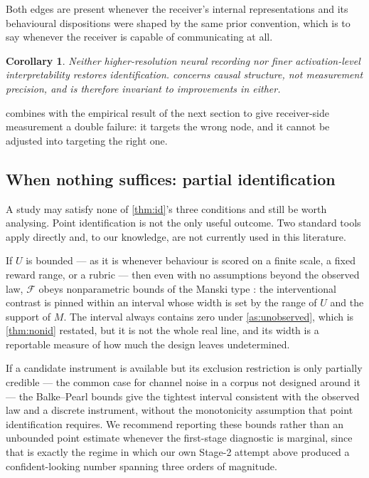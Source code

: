 \documentclass[11pt,a4paper]{article}
\theoremstyle{plain}
\newtheorem{corollary}[corollary]{Corollary}
\theoremstyle{definition}
\theoremstyle{remark}
\newcommand{\Fc}{\mathcal{F}}
\begin{document}
Both edges are present whenever the receiver's internal representations and its behavioural
dispositions were shaped by the same prior convention, which is to say whenever the receiver is
capable of communicating at all.

\begin{corollary}\label{cor:resolution}
Neither higher-resolution neural recording nor finer activation-level interpretability restores
identification.  concerns causal structure, not measurement precision, and
is therefore invariant to improvements in either.
\end{corollary}

 combines with the empirical result of the next section to give
receiver-side measurement a double failure: it targets the wrong node, and it cannot be adjusted
into targeting the right one.

\subsection{When nothing suffices: partial identification}\label{sec:bounds}

A study may satisfy none of \cref{thm:id}'s three conditions and still be worth analysing. Point
identification is not the only useful outcome. Two standard tools apply directly and, to our
knowledge, are not currently used in this literature.

If $U$ is bounded --- as it is whenever behaviour is scored on a finite scale, a fixed reward
range, or a rubric --- then even with no assumptions beyond the observed law, $\Fc$ obeys
nonparametric bounds of the Manski type \citep{manski1990nonparametric}: the interventional
contrast is pinned within an interval whose width is set by the range of $U$ and the support of
$M$. The interval always contains zero under \cref{as:unobserved}, which is \cref{thm:nonid}
restated, but it is not the whole real line, and its width is a reportable measure of how much
the design leaves undetermined.

If a candidate instrument is available but its exclusion restriction is only partially credible
--- the common case for channel noise in a corpus not designed around it --- the Balke--Pearl
bounds \citep{balke1997bounds} give the tightest interval consistent with the observed law and a
discrete instrument, without the monotonicity assumption that point identification requires. We
recommend reporting these bounds rather than an unbounded point estimate whenever the first-stage
diagnostic is marginal, since that is exactly the regime in which our own Stage-2 attempt above
produced a confident-looking number spanning three orders of magnitude.
\end{document}
